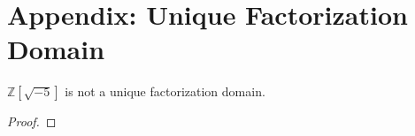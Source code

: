 \section{Appendix: Unique Factorization Domain}
\begin{exmbox}
    \begin{example}
        \(\mathbb{Z}[\sqrt{-5}]\) is not a unique factorization domain.
    \end{example}
\end{exmbox}
\begin{proof}
    
\end{proof}